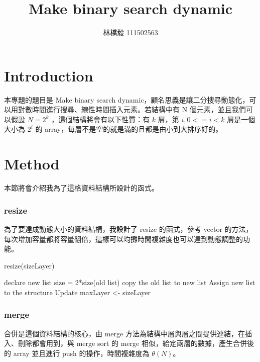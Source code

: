 \documentclass[12pt]{article}
\title{Make binary search dynamic}
\author{林橋毅 111502563}
\begin{document}
	
	\maketitle
	
	\part{Introduction}
	本專題的題目是 Make binary search dynamic，顧名思義是讓二分搜尋動態化，可以用對數時間進行搜尋、線性時間插入元素。若結構中有 N 個元素，並且我們可以假設 $N = 2^k$ ，這個結構將會有以下性質：有 $k$ 層，第 $i, 0<=i<k$ 層是一個大小為 $2^i$ 的 array，每層不是空的就是滿的且都是由小到大排序好的。
	\part{Method}
	本節將會介紹我為了這格資料結構所設計的函式。
	\section{resize}
	為了要達成動態大小的資料結構，我設計了 resize 的函式，參考 vector 的方法，每次增加容量都將容量翻倍，這樣可以均攤時間複雜度也可以達到動態調整的功能。
	\begin{algorithm}[H]
		\caption{resize(sizeLayer)}
		\begin{algorithmic}
				
				\State declare new list size = 2*size(old list)
				\State copy the old list to new list 
				\State Assign new list to the structure
				\State Update maxLayer <- sizeLayer
		\end{algorithmic}
	\end{algorithm}
	\section{merge}
		合併是這個資料結構的核心，由 merge 方法為結構中層與層之間提供連結，在插入、刪除都會用到，與 merge sort 的 merge 相似，給定兩層的數據，產生合併後的 array 並且進行 push 的操作，時間複雜度為 $\theta(N)$。
		
\end{document}
